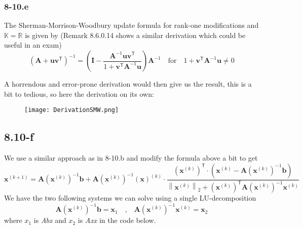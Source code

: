 \documentclass{article}
\begin{document}
\subsubsection*{8-10.e}
The Sherman-Morrison-Woodbury update formula for rank-one modifications and $\mathbb{K} = \mathbb{R}$ is given by (Remark 8.6.0.14 shows a similar derivation which could be useful in an exam)
\begin{equation*}
    \left(\mathbf{A} + \mathbf{u}\mathbf{v}^{\mathsf{T}}\right)^{-1} = \left(\mathbf{I} - \frac{\mathbf{A}^{-1}\mathbf{u}\mathbf{v}^{\mathsf{T}}}{1 + \mathbf{v}^{\mathsf{T}}\mathbf{A}^{-1}\mathbf{u}}\right)\mathbf{A}^{-1} \quad \text{for} \quad 1 + \mathbf{v}^{\mathsf{T}}\mathbf{A}^{-1}\mathbf{u} \neq 0
\end{equation*}

\pagebreak 

\noindent A horrendous and error-prone derivation would then give us the result, this is a bit to tedious, so here the derivation on its own:
\begin{figure}[!hbt]
    \centering
    \texttt{[image: DerivationSMW.png]}
\end{figure}

\pagebreak

\subsection*{8.10-f} 
We use a similar approach as in 8-10.b and modify the formula above a bit to get
\begin{equation*}
    \mathbf{x}^{\left(k+1\right)} = \mathbf{A}\left(\mathbf{x}^{\left(k\right)}\right)^{-1}\mathbf{b} + \mathbf{A}\left(\mathbf{x}^{\left(k\right)}\right)^{-1}\left(\mathbf{x}\right)^{\left(k\right)} \cdot \frac{\left(\mathbf{x}^{\left(k\right)}\right)^{\mathsf{T}} \cdot \left(\mathbf{x}^{\left(k\right)} - \mathbf{A}\left(\mathbf{x}^{\left(k\right)}\right)^{-1}\mathbf{b}\right)}{\left\lVert \mathbf{x}^{\left(k\right)} \right\rVert_{2} + \left(\mathbf{x}^{\left(k\right)}\right)^{\mathsf{T}}\mathbf{A}\left(\mathbf{x}^{\left(k\right)}\right)^{-1} \mathbf{x}^{\left(k\right)}}
\end{equation*}
We have the two following systems we can solve using a single LU-decomposition
\begin{equation*}
\mathbf{A}\left(\mathbf{x}^{\left(k\right)}\right)^{-1}\mathbf{b} = \mathbf{x}_{1} \quad \text{,} \quad \mathbf{A}\left(\mathbf{x}^{\left(k\right)}\right)^{-1}\mathbf{x}^{\left(k\right)} = \mathbf{x}_{2}
\end{equation*}
where $x_{1}$ is \textit{Abx} and $x_{2}$ is \textit{Axx} in the code below.
\end{document}

